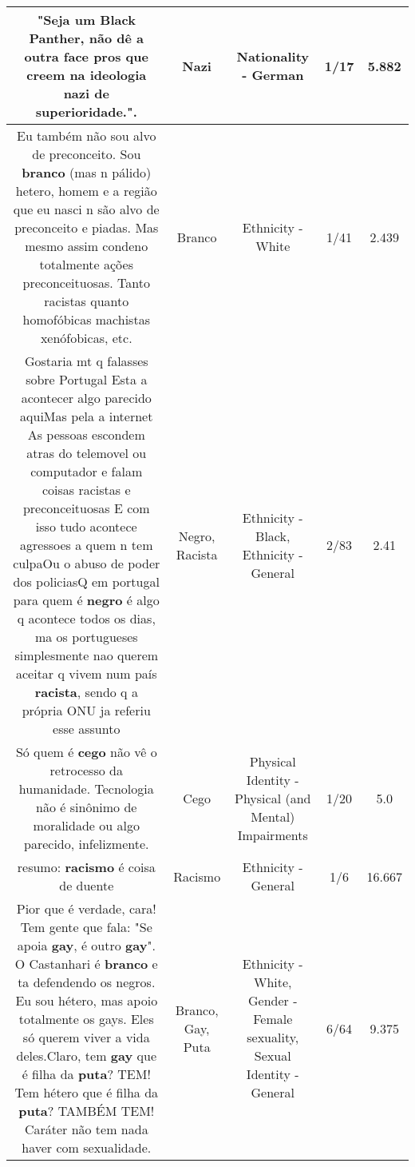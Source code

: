 \documentclass[11pt]{article}
\newlength\mylength
\begin{document}
\begin{center}
\begin{longtable}{|C{.65\mylength}|C{.30\mylength}|C{.12\mylength}|C{.12\mylength}|C{.12\mylength}|}
  \small "Seja um Black Panther, não dê a outra face pros que creem na ideologia \textbf{nazi} de superioridade.".\normalsize   & Nazi & Nationality - German & 1/17 & 5.882 \\  \hline
  \small Eu também não sou alvo de preconceito. Sou \textbf{branco} (mas n pálido) hetero, homem e a região que eu nasci n são alvo de preconceito e piadas. Mas mesmo assim condeno totalmente ações preconceituosas. Tanto racistas quanto homofóbicas machistas xenófobicas, etc.\normalsize   & Branco & Ethnicity - White & 1/41 & 2.439 \\  \hline
  \small Gostaria mt q falasses sobre Portugal Esta a acontecer algo parecido aquiMas pela a internet  As pessoas escondem atras do telemovel ou computador e falam coisas racistas e preconceituosas E com isso tudo acontece agressoes a quem n tem culpaOu o abuso de poder dos policiasQ em portugal para quem é \textbf{negro} é algo q acontece todos os dias, ma os portugueses simplesmente nao querem aceitar q vivem num país \textbf{racista}, sendo q a própria ONU ja referiu esse assunto\normalsize   & Negro, Racista & Ethnicity - Black, Ethnicity - General & 2/83 & 2.41 \\  \hline
  \small Só quem é \textbf{cego} não vê o retrocesso da humanidade. Tecnologia não é sinônimo de moralidade ou algo parecido, infelizmente.\normalsize   & Cego & Physical Identity - Physical (and Mental) Impairments & 1/20 & 5.0 \\  \hline
  \small resumo: \textbf{racismo} é coisa de duente\normalsize   & Racismo & Ethnicity - General & 1/6 & 16.667 \\  \hline
  \small Pior que é verdade, cara! Tem gente que fala: "Se apoia \textbf{gay}, é outro \textbf{gay}". O Castanhari é \textbf{branco} e ta defendendo os negros. Eu sou hétero, mas apoio totalmente os gays. Eles só querem viver a vida deles.Claro, tem \textbf{gay} que é filha da \textbf{puta}? TEM! Tem hétero que é filha da \textbf{puta}? TAMBÉM TEM! Caráter não tem nada haver com sexualidade.\normalsize   & Branco, Gay, Puta & Ethnicity - White, Gender - Female sexuality, Sexual Identity - General & 6/64 & 9.375 \\  \hline

\end{longtable}
\end{center}
\end{document}
